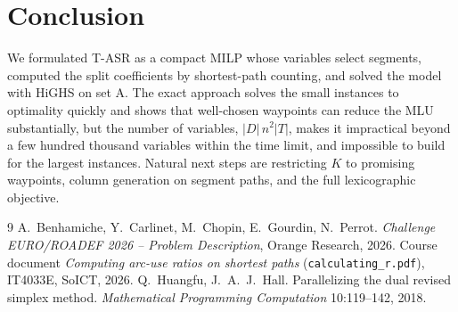 \documentclass[11pt,a4paper]{article}
\begin{document}
\section{Conclusion}

We formulated T-ASR as a compact MILP whose variables select segments, computed the split coefficients by
shortest-path counting, and solved the model with HiGHS on set A. The exact approach solves the small
instances to optimality quickly and shows that well-chosen waypoints can reduce the MLU substantially, but the
number of variables, $|D|\,n^2|T|$, makes it impractical beyond a few hundred thousand variables within the
time limit, and impossible to build for the largest instances. Natural next steps are restricting $K$ to
promising waypoints, column generation on segment paths, and the full lexicographic objective.

\begin{thebibliography}{9}
 A.~Benhamiche, Y.~Carlinet, M.~Chopin, E.~Gourdin, N.~Perrot.
\emph{Challenge EURO/ROADEF 2026 -- Problem Description}, Orange Research, 2026.
 Course document \emph{Computing arc-use ratios on shortest paths} (\texttt{calculating\_r.pdf}), IT4033E, SoICT, 2026.
 Q.~Huangfu, J.~A.~J.~Hall. Parallelizing the dual revised simplex method.
\emph{Mathematical Programming Computation} 10:119--142, 2018.
\end{thebibliography}
\end{document}
